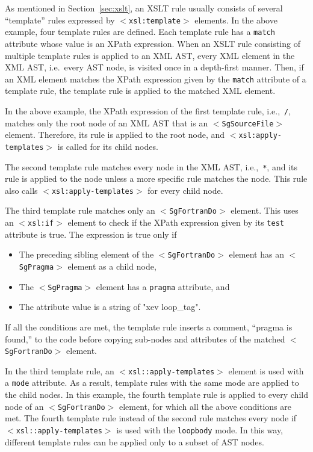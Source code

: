 As mentioned in Section~\ref{sec:xslt}, an XSLT rule usually consists of
several ``template'' rules expressed by \texttt{$<$xsl:template$>$}
elements. In the above example, four template rules are defined. Each
template rule has a \texttt{match} attribute whose value is an XPath
expression. When an XSLT rule consisting of multiple template rules is
applied to an XML AST, every XML element in the XML AST, i.e.~every AST
node, is visited once in a depth-first manner. Then, if an XML element
matches the XPath expression given by the \texttt{match} attribute of a
template rule, the template rule is applied to the matched XML element.

In the above example, the XPath expression of the first template rule,
i.e.,~\texttt{/}, matches only the root node of an XML AST that is an
\texttt{$<$SgSourceFile$>$} element. Therefore, its rule is applied to
the root node, and \texttt{$<$xsl:apply-templates$>$} is called for
its child nodes.

The second template rule matches every node in the XML AST,
i.e.,~\texttt{*}, and its rule is applied to the node unless a more
specific rule matches the node.  This rule also calls
\texttt{$<$xsl:apply-templates$>$} for every child node.

The third template rule matches only an \texttt{$<$SgFortranDo$>$}
element. This uses an \texttt{$<$xsl:if$>$} element to check if the
XPath expression given by its \texttt{test} attribute is true. The
expression is true only if
\begin{itemize}
 \item The preceding sibling element of the \texttt{$<$SgFortranDo$>$}
       element has an \texttt{$<$SgPragma$>$} element as a child node,
 \item The \texttt{$<$SgPragma$>$} element has a \texttt{pragma}
       attribute, and
 \item The attribute value is a string of "xev loop\_tag".
\end{itemize}
If all the conditions are met, the template rule inserts a comment,
``pragma is found,'' to the code before copying sub-nodes and attributes
of the matched \texttt{$<$SgFortranDo$>$} element.

In the third template rule, an \texttt{$<$xsl::apply-templates$>$}
element is used with a \texttt{mode} attribute. As a result, template
rules with the same mode are applied to the child nodes. In this
example, the fourth template rule is applied to every child node of an
\texttt{$<$SgFortranDo$>$} element, for which all the above conditions
are met. The fourth template rule instead of the second rule matches
every node if \texttt{$<$xsl::apply-templates$>$} is used with the
\texttt{loopbody} mode. In this way, different template rules can be
applied only to a subset of AST nodes.



